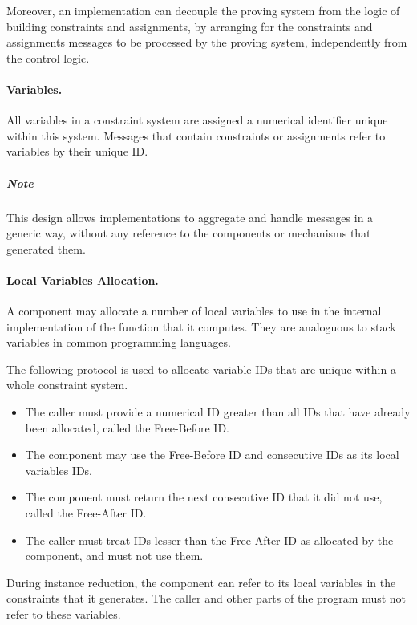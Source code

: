 	Moreover, an implementation can decouple the proving system
	from the logic of building constraints and assignments,
	by arranging for the constraints and assignments messages
	to be processed by the proving system, independently from the control logic.

\paragraph{Variables.}

	All variables in a constraint system are assigned a numerical identifier
	unique within this system.
	Messages that contain constraints or assignments refer to variables by their
	unique ID.

	\subparagraph{Note}
	This design allows implementations to aggregate and handle messages in a generic way,
	without any	reference to the components or mechanisms that generated them.


\paragraph{Local Variables Allocation.}

	A component may allocate a number of local variables to use
	in the internal implementation of the function that it computes.
	They are analoguous to stack variables in common programming languages.

	The following protocol is used to allocate variable IDs that are
	unique within a whole constraint system.
	\begin{itemize}
		\item The caller must provide a numerical ID greater than all IDs that have already been allocated, called the Free-Before ID.
		\item The component may use the Free-Before ID and consecutive IDs as its local variables IDs.
		\item The component must return the next consecutive ID that it did not use, called the Free-After ID.
		\item The caller must treat IDs lesser than the Free-After ID as allocated by the component,
			and must not use them.
	\end{itemize}

	During instance reduction, the component can refer to
	its local variables in the constraints that it generates.
	The caller and other parts of the program must not refer to these variables.


